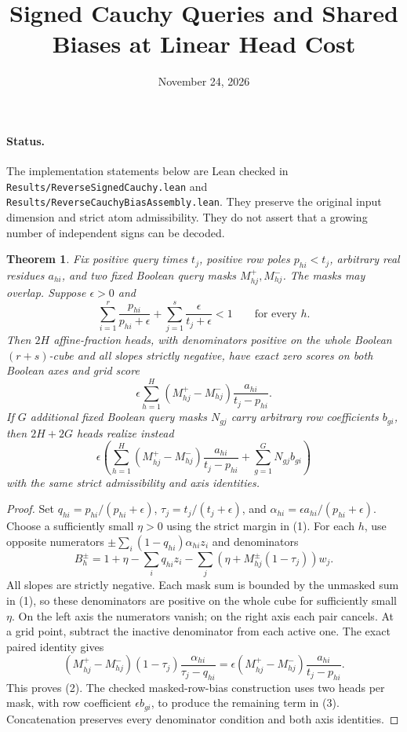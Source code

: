 \documentclass[11pt]{article}
\newtheorem{theorem}{Theorem}
\begin{document}
\title{Signed Cauchy Queries and Shared Biases at Linear Head Cost}
\author{}
\date{November 24, 2026}
\maketitle

\paragraph{Status.}
The implementation statements below are Lean checked in
\texttt{Results/ReverseSignedCauchy.lean} and
\texttt{Results/ReverseCauchyBiasAssembly.lean}. They preserve the
original input dimension and strict atom admissibility. They do not
assert that a growing number of independent signs can be decoded.

\begin{theorem}
Fix positive query times $t_j$, positive row poles $p_{hi}<t_j$,
arbitrary real residues $a_{hi}$, and two fixed Boolean query masks
$M^+_{hj},M^-_{hj}$. The masks may overlap. Suppose $\epsilon>0$ and
\[
 \sum_{i=1}^r\frac{p_{hi}}{p_{hi}+\epsilon}
 +\sum_{j=1}^s\frac{\epsilon}{t_j+\epsilon}<1
 \qquad\text{for every }h.
 \tag{1}
\]
Then $2H$ affine-fraction heads, with denominators positive on the
whole Boolean $(r+s)$-cube and all slopes strictly negative, have
exact zero scores on both Boolean axes and grid score
\[
 \epsilon\sum_{h=1}^H
 (M^+_{hj}-M^-_{hj})\frac{a_{hi}}{t_j-p_{hi}}.
 \tag{2}
\]
If $G$ additional fixed Boolean query masks $N_{gj}$ carry arbitrary
row coefficients $b_{gi}$, then $2H+2G$ heads realize instead
\[
 \epsilon\left(\sum_{h=1}^H
 (M^+_{hj}-M^-_{hj})\frac{a_{hi}}{t_j-p_{hi}}
 +\sum_{g=1}^G N_{gj}b_{gi}\right)
 \tag{3}
\]
with the same strict admissibility and axis identities.
\end{theorem}
\begin{proof}
Set $q_{hi}=p_{hi}/(p_{hi}+\epsilon)$,
$\tau_j=t_j/(t_j+\epsilon)$, and
$\alpha_{hi}=\epsilon a_{hi}/(p_{hi}+\epsilon)$.
Choose a sufficiently small $\eta>0$ using the strict margin in (1).
For each $h$, use opposite numerators
$\pm\sum_i(1-q_{hi})\alpha_{hi}z_i$ and denominators
\[
 B_h^\pm=1+\eta-\sum_iq_{hi}z_i
 -\sum_j\left(\eta+M^\pm_{hj}(1-\tau_j)\right)w_j.
\]
All slopes are strictly negative. Each mask sum is bounded by the
unmasked sum in (1), so these denominators are positive on the
whole cube for sufficiently small $\eta$. On the left axis the
numerators vanish; on the right axis each pair cancels.
At a grid point, subtract the inactive denominator from each active
one. The exact paired identity gives
\[
 (M^+_{hj}-M^-_{hj})(1-\tau_j)
 \frac{\alpha_{hi}}{\tau_j-q_{hi}}
 =\epsilon(M^+_{hj}-M^-_{hj})
 \frac{a_{hi}}{t_j-p_{hi}}.
\]
This proves (2). The checked masked-row-bias construction uses two
heads per mask, with row coefficient $\epsilon b_{gi}$, to produce
the remaining term in (3). Concatenation preserves every denominator
condition and both axis identities.
\end{proof}
\end{document}
